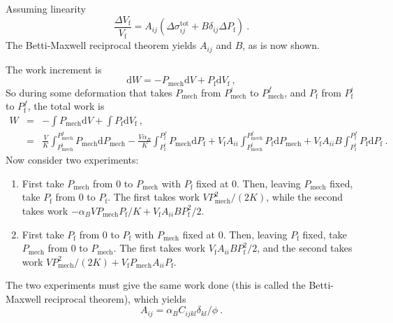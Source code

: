 \documentclass[12pt]{report}
\def\d{\mathrm{d}}
\def\mechpressure{P_{\mathrm{mech}}}
\begin{document}
Assuming linearity
\begin{equation}
\frac{\Delta V_{\mathrm{f}}}{V_{\mathrm{f}}} = A_{ij}
(\Delta\sigma_{ij}^{\mathrm{tot}} + B \delta_{ij}\Delta
P_{\mathrm{f}}) \ .
\label{eqn.deltavf}
\end{equation}
The Betti-Maxwell reciprocal theorem yields $A_{ij}$ and $B$, as is
now shown.

The work increment is
\begin{equation}
\d W = -\mechpressure \d V + P_{\mathrm{f}} \d V_{\mathrm{f}} \ ,
\end{equation}
So during some deformation that takes $\mechpressure$ from
$\mechpressure^{i}$ to $\mechpressure^{f}$, and $P_{\mathrm{f}}$ from
$P_{\mathrm{f}}^{i}$ to $P_{\mathrm{f}}^{f}$, the total work is
\begin{eqnarray}
W & = & -\int \mechpressure\d V + \int P_{\mathrm{f}}\d V_{\mathrm{f}}
\ , \nonumber \\ & = &
\frac{V}{K}\int_{\mechpressure^{i}}^{\mechpressure^{f}}\mechpressure
\d \mechpressure -
\frac{V{\alpha_{B}}}{K}\int_{P_{\mathrm{f}}^{i}}^{P_{\mathrm{f}}^{f}}\mechpressure
\d P_{\mathrm{f}} +
V_{\mathrm{f}}A_{ii}\int_{\mechpressure^{i}}^{\mechpressure^{f}}P_{\mathrm{f}}
\d \mechpressure +
V_{\mathrm{f}}A_{ii}B\int_{P_{\mathrm{f}}^{i}}^{P_{\mathrm{f}}^{f}}
P_{\mathrm{f}} \d P_{\mathrm{f}} \ .
\end{eqnarray}
Now consider two experiments:
\begin{enumerate}
\item First take $\mechpressure$ from $0$ to $\mechpressure$ with
  $P_{\mathrm{f}}$ fixed at $0$.   Then,
  leaving $\mechpressure$ fixed, take $P_{\mathrm{f}}$ from $0$ to
  $P_{\mathrm{f}}$.  The first takes work $V\mechpressure^2/(2K)$,
  while the second takes work $-{\alpha_{B}} V\mechpressure P_{\mathrm{f}}/K +
  V_{\mathrm{f}}A_{ii}B P_{\mathrm{f}}^{2}/2$.
\item First take $P_{\mathrm{f}}$ from $0$ to $P_{\mathrm{f}}$ with
  $\mechpressure$ fixed at $0$.   Then,
  leaving $P_{\mathrm{f}}$ fixed, take $\mechpressure$ from $0$ to
  $\mechpressure$.  The first takes work
  $V_{\mathrm{f}}A_{ii}B P_{\mathrm{f}}^{2}/2$, and the
  second takes work  $V\mechpressure^{2}/(2K) +
  V_{\mathrm{f}}\mechpressure A_{ii}P_{\mathrm{f}}$.
\end{enumerate}
The two experiments must give the same work done (this is called the
Betti-Maxwell reciprocal theorem), which yields
\begin{equation}
A_{ij} = \alpha_{B} C_{ijkl}\delta_{kl}/\phi \ .
\label{tildek.eqn}
\end{equation}
\end{document}
